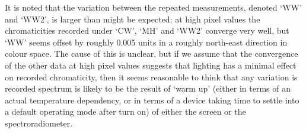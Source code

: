 It is noted that the variation between the repeated measurements, denoted `WW' and `WW2', is larger than might be expected; at high pixel values the chromaticities recorded under `CW', `MH' and `WW2' converge very well, but `WW' seems offset by roughly 0.005 units in a roughly north-east direction in colour space. The cause of this is unclear, but if we assume that the convergence of the other data at high pixel values suggests that lighting has a minimal effect on recorded chromaticity, then it seems reasonable to think that any variation is recorded spectrum is likely to be the result of `warm up' (either in terms of an actual temperature dependency, or in terms of a device taking time to settle into a default operating mode after turn on) of either the screen or the spectroradiometer. 








